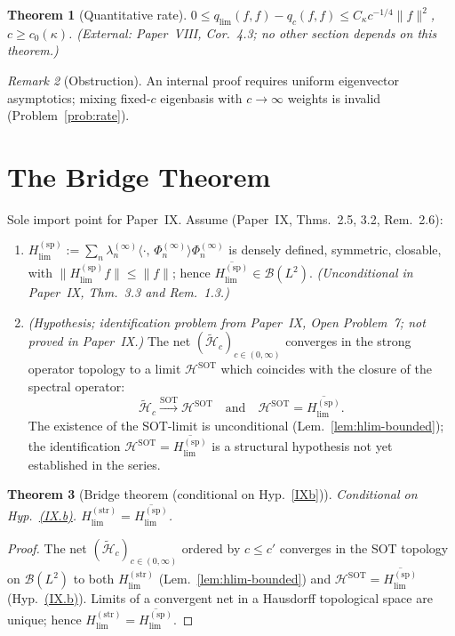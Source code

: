 \documentclass[12pt,a4paper]{amsart}
\newtheorem{theorem}{Theorem}[section]
\theoremstyle{definition}
\theoremstyle{remark}
\newtheorem{remark}[theorem]{Remark}
\newcommand{\ip}[2]{\langle #1,\, #2\rangle}
\newcommand{\Hc}{\widetilde{\mathcal{H}}_c}
\newcommand{\Hstrong}{H_{\lim}^{(\mathrm{str})}}
\newcommand{\Hspectral}{H_{\lim}^{(\mathrm{sp})}}
\newcommand{\HSOT}{\mathcal{H}^{\mathrm{SOT}}}
\newcommand{\qc}{q_c}
\newcommand{\qlim}{q_{\lim}}
\begin{document}
\begin{theorem}[Quantitative rate]
\label{thm:rate-ext}
$0\le\qlim(f,f)-\qc(f,f)
\le C_\kappa c^{-1/4}\|f\|^2$,
$c\ge c_0(\kappa)$.
(External: Paper~VIII, Cor.~4.3;
no other section depends on this
theorem.)
\end{theorem}

\begin{remark}[Obstruction]
\label{rem:no-indep-proof}
An internal proof requires uniform
eigenvector asymptotics;
mixing fixed-$c$ eigenbasis with
$c\to\infty$ weights is invalid
(Problem~\ref{prob:rate}).
\end{remark}

\section{The Bridge Theorem}
\label{sec:bridge}

Sole import point for Paper~IX.
Assume (Paper~IX, Thms.~2.5, 3.2,
Rem.~2.6):
\begin{enumerate}[(IX.a)]
\item\label{IXa}
  $\Hspectral:=
  \sum_n\lambda_n^{(\infty)}
  \ip{\cdot}{\Phi_n^{(\infty)}}
  \Phi_n^{(\infty)}$
  is densely defined, symmetric,
  closable, with
  $\|\Hspectral f\|\le\|f\|$;
  hence
  $\overline{\Hspectral}\in
  \mathcal{B}(L^2)$.
  \emph{(Unconditional in Paper~IX,
  Thm.~3.3 and Rem.~1.3.)}
\item\label{IXb}
  \emph{(Hypothesis; identification
  problem from Paper~IX,
  Open Problem~7;
  not proved in Paper~IX.)}
  The net $(\Hc)_{c\in(0,\infty)}$
  converges in the strong operator
  topology to a limit $\HSOT$ which
  coincides with the closure of the
  spectral operator:
  \[
    \Hc\xrightarrow{\mathrm{SOT}}\HSOT
    \quad\text{and}\quad
    \HSOT=\overline{\Hspectral}.
  \]
  The existence of the SOT-limit is
  unconditional
  (Lem.~\ref{lem:hlim-bounded});
  the identification
  $\HSOT=\overline{\Hspectral}$
  is a structural hypothesis
  not yet established in the series.
\end{enumerate}

\begin{theorem}[Bridge theorem
  (conditional on Hyp.~\ref{IXb})]
\label{thm:bridge}
\emph{Conditional on
Hyp.~\hyperref[IXb]{(IX.b)}.}
$\Hstrong=\overline{\Hspectral}$.
\end{theorem}
\begin{proof}
The net $(\Hc)_{c\in(0,\infty)}$
ordered by $c\le c'$ converges
in the SOT topology on
$\mathcal{B}(L^2)$ to both
$\Hstrong$ (Lem.~\ref{lem:hlim-bounded})
and $\HSOT=\overline{\Hspectral}$
(Hyp.~\hyperref[IXb]{(IX.b)}).
Limits of a convergent net in a
Hausdorff topological space are
unique; hence
$\Hstrong=\overline{\Hspectral}$.
\end{proof}
\end{document}
